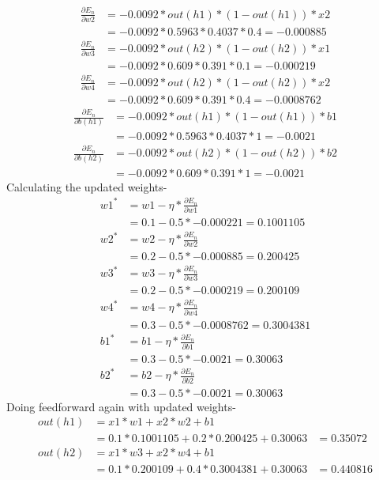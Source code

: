 \documentclass[12pt]{article}
\begin{document}
\begin{align*}
    \frac{\partial E_n}{\partial w2}
    &=-0.0092*out(h1)*(1-out(h1)) * x2\\
    &=-0.0092*0.5963*0.4037*0.4=-0.000885
\end{align*}
\begin{align*}
    \frac{\partial E_n}{\partial w3}
    &=-0.0092*out(h2)*(1-out(h2)) * x1\\
    &=-0.0092*0.609*0.391*0.1=-0.000219
\end{align*}
\begin{align*}
    \frac{\partial E_n}{\partial w4}
    &=-0.0092*out(h2)*(1-out(h2)) * x2\\
    &=-0.0092*0.609*0.391*0.4=-0.0008762
\end{align*}
\begin{align*}
    \frac{\partial E_n}{\partial b(h1)}
    &=-0.0092*out(h1)*(1-out(h1)) * b1\\
    &=-0.0092*0.5963*0.4037*1=-0.0021
\end{align*}
\begin{align*}
    \frac{\partial E_n}{\partial b(h2)}
    &=-0.0092*out(h2)*(1-out(h2)) * b2\\
    &=-0.0092*0.609*0.391*1=-0.0021
\end{align*}
Calculating the updated weights-
\begin{align*}
    w1^{*}
    &=w1-\eta * \frac{\partial E_n}{\partial w1}\\
    &=0.1-0.5*-0.000221=0.1001105\\
    w2^{*}
    &=w2-\eta * \frac{\partial E_n}{\partial w2}\\
    &=0.2-0.5*-0.000885=0.200425\\
    w3^{*}
    &=w3-\eta * \frac{\partial E_n}{\partial w3}\\
    &=0.2-0.5*-0.000219=0.200109\\
    w4^{*}
    &=w4-\eta * \frac{\partial E_n}{\partial w4}\\
    &=0.3-0.5*-0.0008762=0.3004381\\
    b1^{*}
    &=b1-\eta * \frac{\partial E_n}{\partial b1}\\
    &=0.3-0.5*-0.0021=0.30063\\
    b2^{*}
    &=b2-\eta * \frac{\partial E_n}{\partial b2}\\
    &=0.3-0.5*-0.0021=0.30063
\end{align*}
Doing feedforward again with updated weights-
\begin{align*}
    out(h1)
    &=x1 * w1 + x2 * w2 +b1\\
    &=0.1 * 0.1001105 + 0.2*0.200425 + 0.30063
    &=0.35072\\
    out(h2)
    &= x1 * w3 + x2 * w4 +b1 \\
    &=0.1*0.200109 + 0.4*0.3004381 + 0.30063
    &=0.440816
\end{align*}
\end{document}
